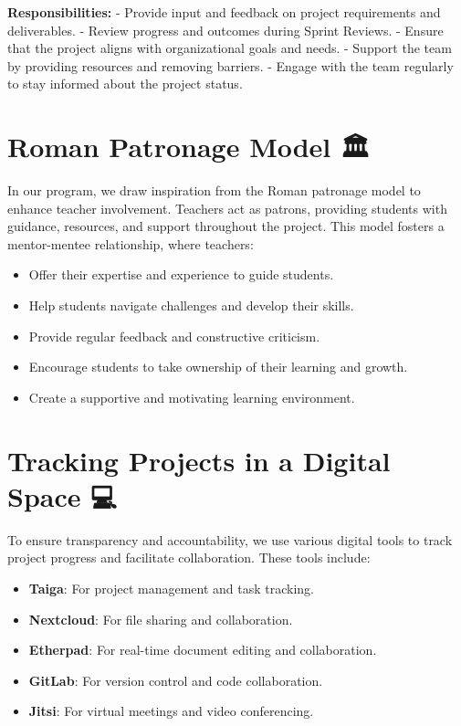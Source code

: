 \documentclass[
  letterpaper,
  DIV=11,
  numbers=noendperiod]{scrreprt}
\providecommand{\tightlist}{%
  \setlength{\itemsep}{0pt}\setlength{\parskip}{0pt}}\usepackage{longtable,booktabs,array}
\begin{document}
\textbf{Responsibilities:} - Provide input and feedback on project
requirements and deliverables. - Review progress and outcomes during
Sprint Reviews. - Ensure that the project aligns with organizational
goals and needs. - Support the team by providing resources and removing
barriers. - Engage with the team regularly to stay informed about the
project status.

\section{Roman Patronage Model 🏛️}\label{roman-patronage-model}

In our program, we draw inspiration from the Roman patronage model to
enhance teacher involvement. Teachers act as patrons, providing students
with guidance, resources, and support throughout the project. This model
fosters a mentor-mentee relationship, where teachers:

\begin{itemize}
\tightlist
\item
  Offer their expertise and experience to guide students.
\item
  Help students navigate challenges and develop their skills.
\item
  Provide regular feedback and constructive criticism.
\item
  Encourage students to take ownership of their learning and growth.
\item
  Create a supportive and motivating learning environment.
\end{itemize}

\section{Tracking Projects in a Digital Space
💻}\label{tracking-projects-in-a-digital-space-1}

To ensure transparency and accountability, we use various digital tools
to track project progress and facilitate collaboration. These tools
include:

\begin{itemize}
\tightlist
\item
  \textbf{Taiga}: For project management and task tracking.
\item
  \textbf{Nextcloud}: For file sharing and collaboration.
\item
  \textbf{Etherpad}: For real-time document editing and collaboration.
\item
  \textbf{GitLab}: For version control and code collaboration.
\item
  \textbf{Jitsi}: For virtual meetings and video conferencing.
\end{itemize}
\end{document}
